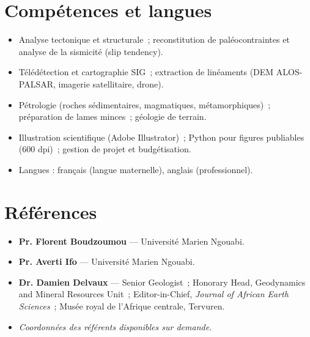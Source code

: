 \documentclass[11pt,a4paper]{article}
\begin{document}
\section{Compétences et langues}
\begin{itemize}
\item Analyse tectonique et structurale~; reconstitution de paléocontraintes et analyse de la sismicité (slip tendency).
\item Télédétection et cartographie SIG~; extraction de linéaments (DEM ALOS-PALSAR, imagerie satellitaire, drone).
\item Pétrologie (roches sédimentaires, magmatiques, métamorphiques)~; préparation de lames minces~; géologie de terrain.
\item Illustration scientifique (Adobe Illustrator)~; Python pour figures publiables (600 dpi)~; gestion de projet et budgétisation.
\item Langues : français (langue maternelle), anglais (professionnel).
\end{itemize}

\section{Références}
\begin{itemize}
\item \textbf{Pr. Florent Boudzoumou} — Université Marien Ngouabi.
\item \textbf{Pr. Averti Ifo} — Université Marien Ngouabi.
\item \textbf{Dr. Damien Delvaux} — Senior Geologist~; Honorary Head, Geodynamics and Mineral Resources Unit~; Editor-in-Chief, \emph{Journal of African Earth Sciences}~; Musée royal de l'Afrique centrale, Tervuren.
\item \emph{Coordonnées des référents disponibles sur demande.}
\end{itemize}
\end{document}
